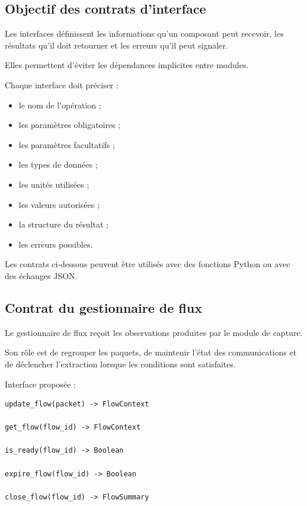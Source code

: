 \subsection{Objectif des contrats d'interface}

Les interfaces définissent les informations qu'un composant peut recevoir, les résultats qu'il doit retourner et les erreurs qu'il peut signaler.

Elles permettent d'éviter les dépendances implicites entre modules.

Chaque interface doit préciser :

\begin{itemize}
    \item le nom de l'opération ;
    \item les paramètres obligatoires ;
    \item les paramètres facultatifs ;
    \item les types de données ;
    \item les unités utilisées ;
    \item les valeurs autorisées ;
    \item la structure du résultat ;
    \item les erreurs possibles.
\end{itemize}

Les contrats ci-dessous peuvent être utilisés avec des fonctions Python ou avec des échanges JSON.

\subsection{Contrat du gestionnaire de flux}

Le gestionnaire de flux reçoit les observations produites par le module de capture.

Son rôle est de regrouper les paquets, de maintenir l'état des communications et de déclencher l'extraction lorsque les conditions sont satisfaites.

Interface proposée :

\begin{verbatim}
update_flow(packet) -> FlowContext

get_flow(flow_id) -> FlowContext

is_ready(flow_id) -> Boolean

expire_flow(flow_id) -> Boolean

close_flow(flow_id) -> FlowSummary
\end{verbatim}

